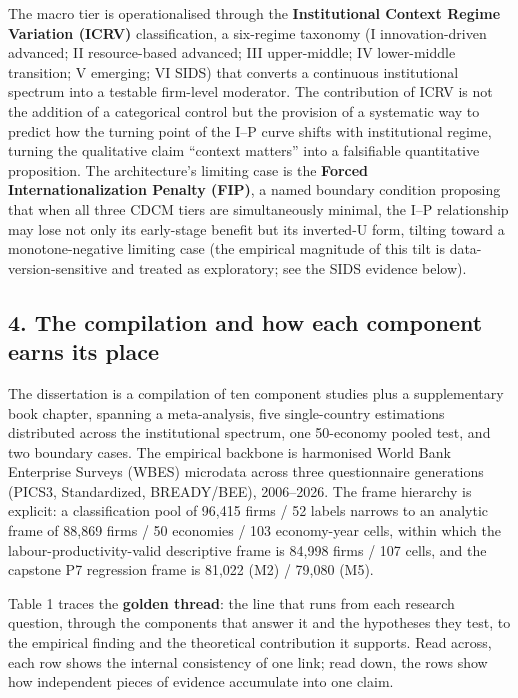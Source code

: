\documentclass[
  a4paper,
  13pt]{extreport}
\begin{document}
The macro tier is operationalised through the \textbf{Institutional
Context Regime Variation (ICRV)} classification, a six-regime taxonomy
(I innovation-driven advanced; II resource-based advanced; III
upper-middle; IV lower-middle transition; V emerging; VI SIDS) that
converts a continuous institutional spectrum into a testable firm-level
moderator. The contribution of ICRV is not the addition of a categorical
control but the provision of a systematic way to predict how the turning
point of the I--P curve shifts with institutional regime, turning the
qualitative claim ``context matters'' into a falsifiable quantitative
proposition. The architecture's limiting case is the \textbf{Forced
Internationalization Penalty (FIP)}, a named boundary condition
proposing that when all three CDCM tiers are simultaneously minimal, the
I--P relationship may lose not only its early-stage benefit but its
inverted-U form, tilting toward a monotone-negative limiting case (the
empirical magnitude of this tilt is data-version-sensitive and treated
as exploratory; see the SIDS evidence below).

\hypertarget{the-compilation-and-how-each-component-earns-its-place}{%
\subsection{4. The compilation and how each component earns its
place}\label{the-compilation-and-how-each-component-earns-its-place}}

The dissertation is a compilation of ten component studies plus a
supplementary book chapter, spanning a meta-analysis, five
single-country estimations distributed across the institutional
spectrum, one 50-economy pooled test, and two boundary cases. The
empirical backbone is harmonised World Bank Enterprise Surveys (WBES)
microdata across three questionnaire generations (PICS3, Standardized,
BREADY/BEE), 2006--2026. The frame hierarchy is explicit: a
classification pool of 96,415 firms / 52 labels narrows to an analytic
frame of 88,869 firms / 50 economies / 103 economy-year cells, within
which the labour-productivity-valid descriptive frame is 84,998 firms /
107 cells, and the capstone P7 regression frame is 81,022 (M2) / 79,080
(M5).

Table 1 traces the \textbf{golden thread}: the line that runs from each
research question, through the components that answer it and the
hypotheses they test, to the empirical finding and the theoretical
contribution it supports. Read across, each row shows the internal
consistency of one link; read down, the rows show how independent pieces
of evidence accumulate into one claim.
\end{document}
